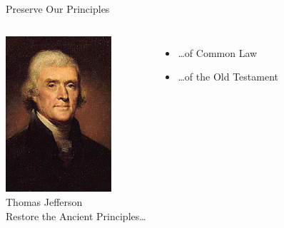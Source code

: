 \begin{frame}{Preserve Our Principles}
    \begin{columns}[onlytextwidth]
            \centering
            \includegraphics[width=0.75\textwidth]{img/jefferson.png} \\
            Thomas Jefferson \\

            Restore the Ancient Principles\ldots
            \begin{itemize}
                \item \ldots of Common Law
                \item \ldots of the Old Testament
            \end{itemize}
    \end{columns}
\end{frame}

